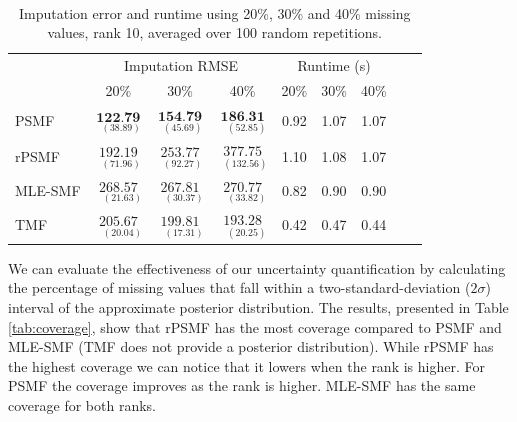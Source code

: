 \documentclass{mldsmsc}
\begin{document}
\begin{table}[H]
\centering
{} \\[0.5ex]
\begin{tabular}{@{}lccc|ccccc@{}}
\toprule
 & \multicolumn{3}{c}{Imputation RMSE} & \multicolumn{3}{c}{Runtime (s)} \\
 & 20\% & 30\% & 40\% & 20\% & 30\% & 40\% \\
\midrule
PSMF & $\underset{{\scriptscriptstyle \;\;(38.89)}}{\textbf{122.79}}$ & $\underset{{\scriptscriptstyle \;\;(45.69)}}{\textbf{154.79}}$ & $\underset{{\scriptscriptstyle \;\;\;(52.85)}}{\textbf{186.31}}$ & 0.92 & 1.07 & 1.07 \\
rPSMF & $\underset{{\scriptscriptstyle \;\;(71.96)}}{192.19}$ & $\underset{{\scriptscriptstyle \;\;(92.27)}}{253.77}$ & $\underset{{\scriptscriptstyle \;\;(132.56)}}{377.75}$ & 1.10 & 1.08 & 1.07\\
MLE-SMF & $\underset{{\scriptscriptstyle \;\;\;(21.63)}}{268.57}$ & $\underset{{\scriptscriptstyle \;\;\;(30.37)}}{267.81}$ & $\underset{{\scriptscriptstyle \;\;\;(33.82)}}{270.77}$ & 0.82 & 0.90 & 0.90 \\
TMF & $\underset{{\scriptscriptstyle \;\;\;(20.04)}}{205.67}$ & $\underset{{\scriptscriptstyle \;\;\;(17.31)}}{199.81}$ & $\underset{{\scriptscriptstyle \;\;\;(20.25)}}{193.28}$ & 0.42 & 0.47 & 0.44 \\
\bottomrule
\end{tabular}
\caption{Imputation error and runtime using 20\%, 30\% and 40\% missing values, rank 10, averaged over 100 random repetitions.}
\label{tab:rmse10}
\end{table}

\noindent  We can evaluate the effectiveness of our uncertainty quantification by calculating the percentage of missing values that fall within a two-standard-deviation ($2\sigma$) interval of the approximate posterior distribution. The results, presented in Table \ref{tab:coverage}, show that rPSMF has the most coverage compared to PSMF and MLE-SMF (TMF does not provide a posterior distribution). While rPSMF has the highest coverage we can notice that it lowers when the rank is higher. For PSMF the coverage improves as the rank is higher. MLE-SMF has the same coverage for both ranks.
\end{document}
